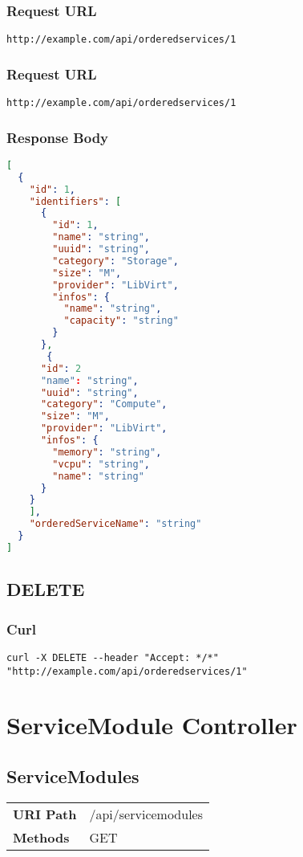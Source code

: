 \subsubsection{Request URL}
\begin{lstlisting}[] 
http://example.com/api/orderedservices/1
\end{lstlisting}

\subsubsection{Request URL}
\begin{lstlisting}[] 
http://example.com/api/orderedservices/1
\end{lstlisting}

\subsubsection{Response Body}
\begin{lstlisting}[language=json] 
[
  {
    "id": 1,
    "identifiers": [
      {
        "id": 1,
        "name": "string",
        "uuid": "string",
        "category": "Storage",
        "size": "M",
        "provider": "LibVirt",
        "infos": {
          "name": "string",
          "capacity": "string"
        }
      },
       {
      "id": 2
      "name": "string",
      "uuid": "string",
      "category": "Compute",
      "size": "M",
      "provider": "LibVirt",
      "infos": {
        "memory": "string",
        "vcpu": "string",
        "name": "string"
      }
    }
    ],
    "orderedServiceName": "string"
  }
]
\end{lstlisting}


\subsection{DELETE}
\subsubsection{Curl}
\begin{lstlisting}[] 
curl -X DELETE --header "Accept: */*" "http://example.com/api/orderedservices/1"
\end{lstlisting}

\section{ServiceModule Controller}
\subsection{ServiceModules}
\begin{tabularx}{\linewidth}{l l}
\textbf{URI Path} & /api/servicemodules\\
\textbf{Methods} & GET\\
\end{tabularx}

